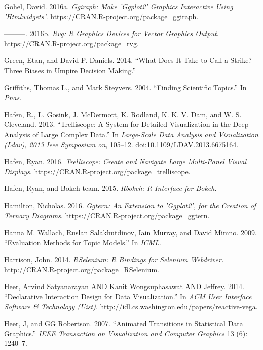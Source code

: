 \documentclass[12pt,]{isuthesis}
\begin{document}
\hypertarget{ref-ggiraph}{}
Gohel, David. 2016a. \emph{Ggiraph: Make 'Ggplot2' Graphics Interactive
Using 'Htmlwidgets'}. \url{https://CRAN.R-project.org/package=ggiraph}.

\hypertarget{ref-rvg}{}
---------. 2016b. \emph{Rvg: R Graphics Devices for Vector Graphics
Output}. \url{https://CRAN.R-project.org/package=rvg}.

\hypertarget{ref-bias}{}
Green, Etan, and David P. Daniels. 2014. ``What Does It Take to Call a
Strike? Three Biases in Umpire Decision Making.''

\hypertarget{ref-Griffiths}{}
Griffiths, Thomas L., and Mark Steyvers. 2004. ``Finding Scientific
Topics.'' In \emph{Pnas}.

\hypertarget{ref-trelliscope}{}
Hafen, R., L. Gosink, J. McDermott, K. Rodland, K. K. V. Dam, and W. S.
Cleveland. 2013. ``Trelliscope: A System for Detailed Visualization in
the Deep Analysis of Large Complex Data.'' In \emph{Large-Scale Data
Analysis and Visualization (Ldav), 2013 Ieee Symposium on}, 105--12.
doi:\href{https://doi.org/10.1109/LDAV.2013.6675164}{10.1109/LDAV.2013.6675164}.

\hypertarget{ref-trelliscope-pkg}{}
Hafen, Ryan. 2016. \emph{Trelliscope: Create and Navigate Large
Multi-Panel Visual Displays}.
\url{https://CRAN.R-project.org/package=trelliscope}.

\hypertarget{ref-rbokeh}{}
Hafen, Ryan, and Bokeh team. 2015. \emph{Rbokeh: R Interface for Bokeh}.

\hypertarget{ref-ggtern}{}
Hamilton, Nicholas. 2016. \emph{Ggtern: An Extension to 'Ggplot2', for
the Creation of Ternary Diagrams}.
\url{https://CRAN.R-project.org/package=ggtern}.

\hypertarget{ref-Wallach}{}
Hanna M. Wallach, Ruslan Salakhutdinov, Iain Murray, and David Mimno.
2009. ``Evaluation Methods for Topic Models.'' In \emph{ICML}.

\hypertarget{ref-RSelenium}{}
Harrison, John. 2014. \emph{RSelenium: R Bindings for Selenium
Webdriver.} \url{http://CRAN.R-project.org/package=RSelenium}.

\hypertarget{ref-vega}{}
Heer, Arvind Satyanarayan AND Kanit Wongsuphasawat AND Jeffrey. 2014.
``Declarative Interaction Design for Data Visualization.'' In \emph{ACM
User Interface Software \& Technology (Uist)}.
\url{http://idl.cs.washington.edu/papers/reactive-vega}.

\hypertarget{ref-animated-transitions}{}
Heer, J, and GG Robertson. 2007. ``Animated Transitions in Statistical
Data Graphics.'' \emph{IEEE Transaction on Visualization and Computer
Graphics} 13 (6): 1240--7.
\end{document}
